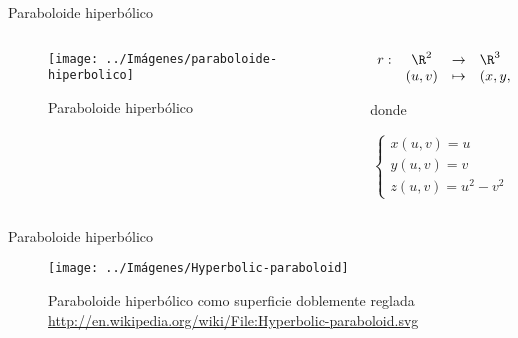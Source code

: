 \documentclass[10pt]{beamer}
\begin{document}
	\begin{frame}{Paraboloide hiperbólico}
		\begin{columns}[t] %
			\begin{column}{.50\textwidth}
				\begin{figure}
					\centering
					\texttt{[image: ../Imágenes/paraboloide-hiperbolico]}
					\caption{Paraboloide hiperbólico}
					\label{fig:paraboloide-hiperbolico}
				\end{figure}
			\end{column}%
			\hfill%
			\begin{column}{.50\textwidth}
				$$\begin{array}{rcll}
				r : & \R^2 & \to & \R^3\\
				& (u,v) & \mapsto & (x,y,z)
				\end{array}$$
				
				donde 
				
				$$ \begin{cases}
				x(u,v) = u \\
				y(u,v) = v \\
				z(u,v) = u^2 - v^2
				\end{cases} $$
			\end{column}%
		\end{columns}
	\end{frame}
	
	\begin{frame}{Paraboloide hiperbólico}
		\begin{figure}
			\centering
			\texttt{[image: ../Imágenes/Hyperbolic-paraboloid]}
			\caption{Paraboloide hiperbólico como superficie doblemente reglada \url{http://en.wikipedia.org/wiki/File:Hyperbolic-paraboloid.svg}}
			\label{fig:Paraboloide hiperbólico-2}
		\end{figure}	
	\end{frame}
	
\end{document}
